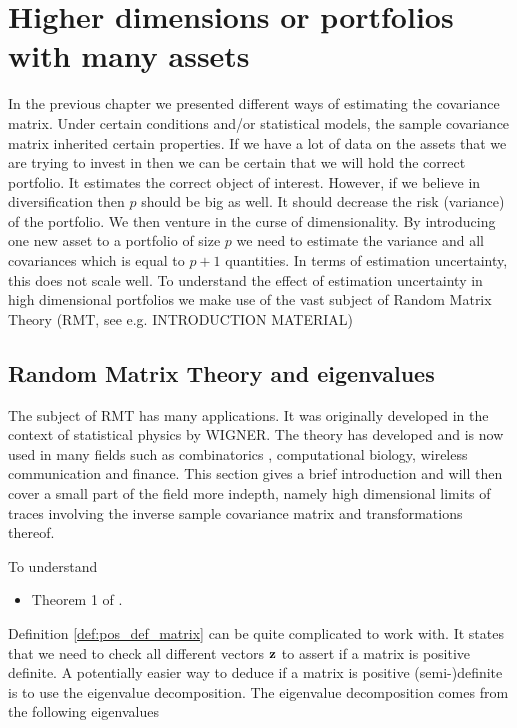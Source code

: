 \documentclass[]{book}
\begin{document}
\chapter{Higher dimensions or portfolios with many assets}
In the previous chapter we presented different ways of estimating the covariance matrix. Under certain conditions and/or statistical models, the sample covariance matrix inherited certain properties. 
If we have a lot of data on the assets that we are trying to invest in then we can be certain that we will hold the correct portfolio. It estimates the correct object of interest. However, if we believe in diversification then $p$ should be big as well. It should decrease the risk (variance) of the portfolio. We then venture in the curse of dimensionality. By introducing one new asset to a portfolio of size $p$ we need to estimate the variance and all covariances which is equal to $p+1$ quantities. In terms of estimation uncertainty, this does not scale well. To understand the effect of estimation uncertainty in high dimensional portfolios we make use of the vast subject of Random Matrix Theory (RMT, see e.g.  \citet{bai2010spectral} INTRODUCTION MATERIAL) 

\section{Random Matrix Theory and eigenvalues}
The subject of RMT has many applications. It was originally developed in the context of statistical physics by \citet{} WIGNER. The theory has developed and is now used in many fields such as combinatorics , computational biology, wireless communication and finance. This section gives a brief introduction and will then cover a small part of the field more indepth, namely high dimensional limits of traces involving the inverse sample covariance matrix and transformations thereof. 

To understand 

\begin{itemize}
	\item Theorem 1 of \citet{rubio2011spectral}.
\end{itemize}


Definition \ref{def:pos_def_matrix} can be quite complicated to work with. It states that we need to check all different vectors $\mathbf{z}$ to assert if a matrix is positive definite. A potentially easier way to deduce if a matrix is positive (semi-)definite is to use the eigenvalue decomposition. The eigenvalue decomposition comes from the following eigenvalues 
\end{document}
